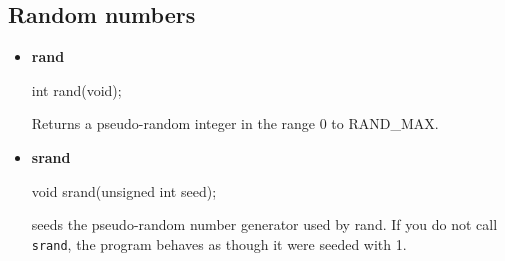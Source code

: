 \documentclass{report}
\begin{document}
    \pagebreak 
    \subsection{Random numbers}
    \begin{itemize}
        \item \textbf{rand}
            \bigbreak \noindent 
            \begin{cppcode}
            int rand(void);
            \end{cppcode}
            \bigbreak \noindent 
            Returns a pseudo-random integer in the range 0 to RAND\_MAX.
        \item \textbf{srand}
            \bigbreak \noindent 
            \begin{cppcode}
            void srand(unsigned int seed);
            \end{cppcode}
            \bigbreak \noindent 
            seeds the pseudo-random number generator used by rand.
            \bigbreak \noindent 
            If you do not call \texttt{srand}, the program behaves as though it were seeded with 1.
    \end{itemize}

    \pagebreak 
\end{document}

